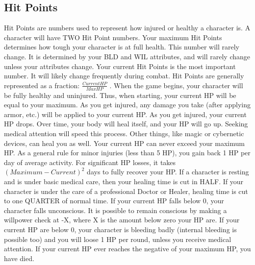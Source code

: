 \documentclass[twoside]{book}
\begin{document}
\subsection{Hit Points}
     Hit Points are numbers used to represent how injured
               or healthy a character is. A character will have TWO Hit
               Point numbers. Your maximum Hit Points determines how
               tough your character is at full health. This number will
               rarely change. It is determined by your BLD and WIL
               attributes, and will rarely change unless your attributes
               change.  Your current Hit Points is the most important number.
              It will likely change frequently during combat. Hit Points
              are generally represented as a fraction: \ensuremath{\frac{
              Current HP }{ Max HP }} . When the
              game begins, your character will be fully healthy and
              uninjured. Thus, when starting, your current HP will be
              equal to your maximum.
             As you get injured, any damage you take (after
               applying armor, etc.) will be applied to your current HP.
               As you get injured, your current HP drops. Over time, your
               body will heal itself, and your HP will go up. Seeking
               medical attention will speed this process. Other things,
               like magic or cybernetic devices, can heal you as well.
                Your current HP can never exceed your maximum HP. As
               a general rule for minor injuries (less than 5 HP), you
               gain back 1 HP per day of average activity. For
               significant HP losses, it takes \ensuremath{  
                    {   (    Maximum  
                      -    Current    )  
                     }^{ 2 }    }  days to fully recover your HP.
             If a character is resting and is under basic medical
               care, then your healing time is cut in HALF. If your
               character is under the care of a professional Doctor or
               Healer, healing time is cut to one QUARTER of normal time.
                If your current HP falls below 0, your character
               falls unconscious. It is possible to remain conscious by
               making a willpower check at -X, where X is the amount
               below zero your HP are. If your current HP are below 0,
               your character is bleeding badly (internal bleeding is
               possible too) and you will loose 1 HP per round, unless
               you receive medical attention. If your current HP ever
               reaches the negative of your maximum HP, you have died.
               
\end{document}
